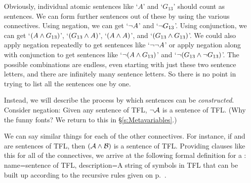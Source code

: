 Obviously, individual atomic sentences like `$A$' and `$G_{13}$' should count as sentences. We can form further sentences out of these by using the various connectives. Using negation, we can get `$\neg A$' and `$\neg G_{13}$'. Using conjunction, we can get `$(A \wedge G_{13})$', `$(G_{13} \wedge A)$', `$(A \wedge A)$', and `$(G_{13} \wedge G_{13})$'. We could also apply negation repeatedly to get sentences like `$\neg \neg A$' or apply negation along with conjunction to get sentences like `$\neg(A \wedge G_{13})$' and `$\neg(G_{13} \wedge \neg G_{13})$'. The possible combinations are endless, even starting with just these two sentence letters, and there are infinitely many sentence letters. So there is no point in trying to list all the sentences one by one.

Instead, we will describe the process by which sentences can be \emph{constructed}. Consider negation: Given any sentence  of TFL, $\neg\mathcal{A}$ is a sentence of TFL. (Why the funny fonts? We return to this in \S\ref{s:Metavariables}.)

We can say similar things for each of the other connectives. For instance, if  and  are sentences of TFL, then $(\mathcal{A}\wedge\mathcal{B})$ is a sentence of TFL. Providing clauses like this for all of the connectives, we arrive at the following formal definition for a :
{
name=sentence of TFL,
description={A string of symbols in TFL that can be built up according to the recursive rules given on p.~\pageref{TFLsentences}.}
}

